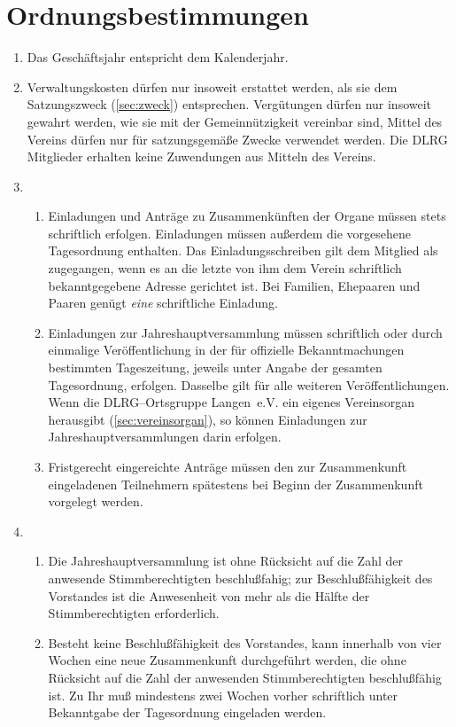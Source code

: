\documentclass[%
12pt, %
a4paper, %
headsepline, %
footsepline, %
parskip, %
headings=normal, %
]{scrartcl}
\begin{document}
\section{Ordnungsbestimmungen}
\label{sec:ordnungsbestimmungen}
\begin{enumerate}
    \item Das Geschäftsjahr entspricht dem Kalenderjahr.
    \item Verwaltungskosten dürfen nur insoweit erstattet werden, als sie dem Satzungszweck (\ref{sec:zweck}) entsprechen. Vergütungen dürfen nur insoweit gewahrt werden, wie sie mit der Gemeinnützigkeit vereinbar sind, Mittel des Vereins dürfen nur für satzungsgemäße Zwecke verwendet werden. Die DLRG Mitglieder erhalten keine Zuwendungen aus Mitteln des Vereins.
    \item \begin{enumerate}[noitemsep]
        \item Einladungen und Anträge zu Zusammenkünften der Organe müssen stets schriftlich erfolgen. Einladungen müssen außerdem die vorgesehene Tagesordnung enthalten. Das Einladungsschreiben gilt dem Mitglied als zugegangen, wenn es an die letzte von ihm dem Verein schriftlich bekanntgegebene Adresse gerichtet ist. Bei Familien, Ehepaaren und Paaren genügt \emph{eine} schriftliche Einladung.
        \item Einladungen zur Jahreshauptversammlung müssen schriftlich oder durch einmalige Veröffentlichung in der für offizielle Bekanntmachungen bestimmten Tageszeitung, jeweils unter Angabe der gesamten Tagesordnung, erfolgen. Dasselbe gilt für alle weiteren Veröffentlichungen. Wenn die DLRG--Ortsgruppe Langen~e.V. ein eigenes Vereinsorgan herausgibt (\ref{sec:vereinsorgan}), so können Einladungen zur Jahreshauptversammlungen darin erfolgen.
        \item Fristgerecht eingereichte Anträge müssen den zur Zusammenkunft eingeladenen Teilnehmern spätestens bei Beginn der Zusammenkunft vorgelegt werden.
      \end{enumerate}
    \item \begin{enumerate}[noitemsep]
        \item Die Jahreshauptversammlung ist ohne Rücksicht auf die Zahl der anwesende Stimmberechtigten beschlußfahig; zur Beschlußfähigkeit des Vorstandes ist die Anwesenheit von mehr als die Hälfte der Stimmberechtigten erforderlich. 
        \item Besteht keine Beschlußfähigkeit des Vorstandes, kann innerhalb von vier Wochen eine neue Zusammenkunft durchgeführt werden, die ohne Rücksicht auf die Zahl der anwesenden Stimmberechtigten beschlußfähig ist. Zu Ihr muß mindestens zwei Wochen vorher schriftlich unter Bekanntgabe der Tagesordnung eingeladen werden.

\end{enumerate}
\end{enumerate}
\end{document}
